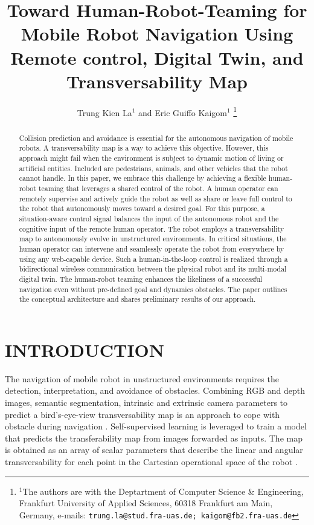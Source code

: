 \documentclass[letterpaper, 10 pt, conference]{ieeeconf}  %
\title{\LARGE \bf
Toward Human-Robot-Teaming for Mobile Robot Navigation Using
 Remote control,  Digital Twin, and  Transversability Map
}
\author{Trung Kien La$^{1}$ and Eric Guiffo Kaigom$^{1}$%
\thanks{$^{1}$The authors are with the Deptartment of Computer Science \& Engineering,
        Frankfurt University of Applied Sciences, 60318 Frankfurt am Main, Germany, e-mails:
        {\tt\small trung.la@stud.fra-uas.de; kaigom@fb2.fra-uas.de}}%
}
\begin{document}
\maketitle
\thispagestyle{empty}
\pagestyle{empty}


\begin{abstract}

Collision prediction and avoidance is essential for the autonomous navigation of mobile robots. A transversability map is a way to achieve this objective. However, this approach might fail when the environment is subject to  dynamic motion of living or artificial entities. Included are pedestrians, animals, and other vehicles that the robot cannot handle. In this paper, we  embrace this challenge by achieving a flexible human-robot teaming that leverages a shared control of the robot. A human operator can remotely supervise and actively guide the robot as well as  share or leave full control to the robot that autonomously moves toward a desired goal. For this purpose, a situation-aware control signal balances the input of the autonomous robot and the cognitive input of the  remote human operator. The robot employs a  transversability map to autonomously evolve in unstructured environments. In critical situations, the human operator can  intervene and seamlessly operate the robot from everywhere by using any web-capable device.  Such a human-in-the-loop control is realized through a bidirectional wireless communication between the physical robot and its multi-modal digital twin.  The human-robot teaming enhances the likeliness of a successful navigation even without pre-defined goal and dynamics obstacles. The paper outlines the conceptual architecture and shares preliminary results of our approach.

\end{abstract}


\section{INTRODUCTION}
The navigation of mobile robot in unstructured environments requires the detection, interpretation, and avoidance of obstacles. Combining  RGB and depth images, semantic segmentation,  intrinsic and extrinsic  camera parameters to predict a bird's-eye-view transversability map is an approach to cope with obstacle during navigation \cite{wayfaster,wayfast,endo2024benchnav}. Self-supervised learning is leveraged to train a model that predicts the transferability map from  images forwarded as inputs. The map is obtained as an array of scalar parameters that describe the linear and angular transversability for each point in the Cartesian operational space of the robot  \cite{wayfaster,wayfast,leung2022hybrid,endo2024benchnav}. 
\end{document}
